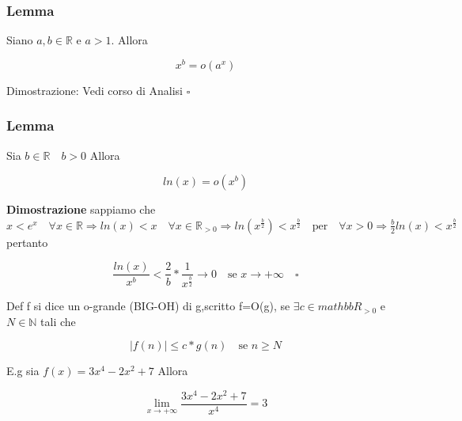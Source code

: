 \documentclass{article}
\begin{document}
        \subsubsection{Lemma}
        \begin{flushleft}
          Siano $a,b \in \mathbb{R}$ e $a>1$. Allora
        \end{flushleft}
        \begin{equation*}
          x^b=o(a^x)
        \end{equation*}
        \begin{flushleft}
          Dimostrazione: Vedi corso di Analisi $\square$
        \end{flushleft}
        \subsubsection{Lemma}
        \begin{flushleft}
          Sia $b\in \mathbb{R} \quad b>0$ Allora
        \end{flushleft}
        \begin{equation*}
          ln(x)=o(x^b)
        \end{equation*}
        \begin{flushleft}
          \textbf{Dimostrazione} sappiamo che $x<e^x \quad \forall x \in \mathbb{R} \Rightarrow ln(x)<x \quad \forall x \in \mathbb{R}_{>0}
          \Rightarrow ln(x^{\frac{b}{2}})<x^{\frac{b}{2}} \quad \text{per} \quad \forall x >0 \Rightarrow \frac{b}{2}ln(x)<x^{\frac{b}{2}}$ pertanto
        \end{flushleft}
        \begin{equation*}
          \frac{ln(x)}{x^b}<\frac{2}{b}*\frac{1}{x^{\frac{b}{2}}} \to 0 \quad \text{se $x\to +\infty \quad \square$}
        \end{equation*}
        \begin{flushleft}
          Def f si dice un o-grande (BIG-OH) di g,scritto f=O(g), se $\exists c \in mathbb{R}_{>0}$ e $N\in \mathbb{N}$ tali che
        \end{flushleft}
        \begin{equation*}
          \mid f(n) \mid \leq c*g(n) \quad \text{se $n \geq N$}
        \end{equation*}
        \begin{flushleft}
          E.g sia $f(x)=3x^4-2x^2+7$ Allora
        \end{flushleft}
        \begin{equation*}
          \lim_{x\to +\infty} \frac{3x^4-2x^2+7}{x^4}=3
        \end{equation*}
\end{document}
